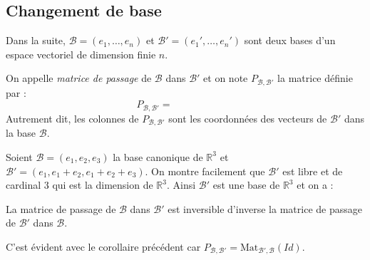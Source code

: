 \documentclass[french,11pt,twoside]{VcCours}
\begin{document}
\subsection{Changement de base}

Dans la suite, $\mathcal{B}=(e_1, \ldots, e_n)$ et $\mathcal{B}'= (e_1', \ldots,e_n')$ sont deux bases d'un espace vectoriel de dimension finie $n$.

\begin{Definition}{} On appelle \emph{matrice de passage} de $\mathcal{B}$ dans $\mathcal{B}'$ et on note $P_{\mathcal{B}, \mathcal{B}'}$ la matrice définie par :
$$ P_{\mathcal{B}, \mathcal{B}'} = \phantom{\textrm{Mat}_{\mathcal{B}', \mathcal{B}}(\textrm{Id})}$$
Autrement dit, les colonnes de $P_{\mathcal{B}, \mathcal{B}'}$ sont les coordonnées des vecteurs de $\mathcal{B}'$ dans la base $\mathcal{B}$.
\end{Definition}

\begin{Exemple} Soient $\mathcal{B}=(e_1,e_2,e_3)$ la base canonique de $\mathbb{R}^3$ et $\mathcal{B}'=(e_1,e_1+e_2, e_1+e_2+e_3)$. On montre facilement que $\mathcal{B}'$ est libre et de cardinal $3$ qui est la dimension de $\mathbb{R}^3$. Ainsi $\mathcal{B}'$ est une base de $\mathbb{R}^3$ et on a :

\vspace{2.7cm}
\end{Exemple}

\begin{Proposition}{} La matrice de passage de $\mathcal{B}$ dans $\mathcal{B}'$ est inversible d'inverse la matrice de passage de $\mathcal{B}'$ dans $\mathcal{B}$.
\end{Proposition}

\begin{Demonstration}{} C'est évident avec le corollaire précédent car $P_{\mathcal{B}, \mathcal{B}'} = \textrm{Mat}_{\mathcal{B}', \mathcal{B}}(Id)$.
\end{Demonstration}

\medskip
\end{document}
